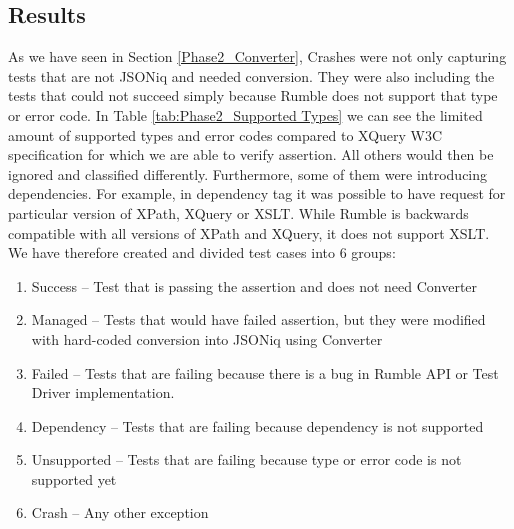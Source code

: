 \subsection{Results}
As we have seen in Section \ref{Phase2_Converter}, Crashes were not only capturing tests that are not JSONiq and needed conversion. They were also including the tests that could not succeed simply because Rumble does not support that type or error code. In Table \ref{tab:Phase2_Supported Types} we can see the limited amount of supported types and error codes compared to XQuery W3C specification for which we are able to verify assertion. All others would then be ignored and classified differently. Furthermore, some of them were introducing dependencies. For example, in dependency tag it was possible to have request for particular version of XPath, XQuery or XSLT. While Rumble is backwards compatible with all versions of XPath and XQuery, it does not support XSLT. We have therefore created and divided test cases into 6 groups:
\begin{enumerate}
	\item Success – Test that is passing the assertion and does not need Converter
	\item Managed – Tests that would have failed assertion, but they were modified with hard-coded conversion into JSONiq using Converter
	\item Failed – Tests that are failing because there is a bug in Rumble API or Test Driver implementation. 
	\item Dependency – Tests that are failing because dependency is not supported
	\item Unsupported – Tests that are failing because type or error code is not supported yet
	\item Crash – Any other exception
\end{enumerate}


